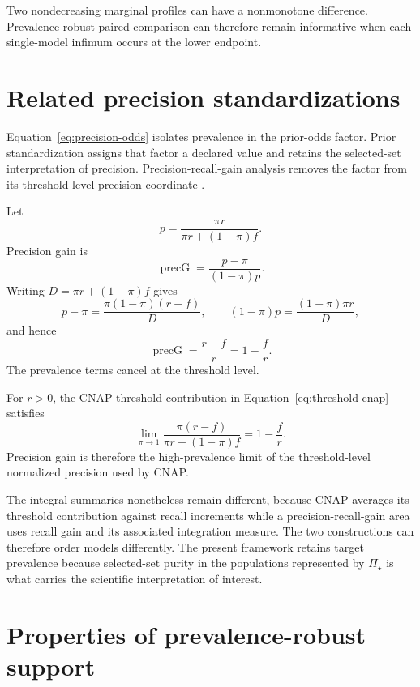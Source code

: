 \documentclass[11pt]{article}
\newcommand{\PSet}{\Pi_\star}
\theoremstyle{remark}
\begin{document}
Two nondecreasing marginal profiles can have a nonmonotone difference. Prevalence-robust paired comparison can therefore remain informative when each single-model infimum occurs at the lower endpoint.

\section{Related precision standardizations}
\label{app:related}

Equation~\eqref{eq:precision-odds} isolates prevalence in the prior-odds factor. Prior standardization assigns that factor a declared value and retains the selected-set interpretation of precision. Precision-recall-gain analysis removes the factor from its threshold-level precision coordinate \cite{flach2015prg}.

Let
\[
p
=
\frac{\pi r}{\pi r+(1-\pi)f}.
\]
Precision gain is
\[
\operatorname{precG}
=
\frac{p-\pi}{(1-\pi)p}.
\]
Writing $D=\pi r+(1-\pi)f$ gives
\[
p-\pi
=
\frac{\pi(1-\pi)(r-f)}{D},
\qquad
(1-\pi)p
=
\frac{(1-\pi)\pi r}{D},
\]
and hence
\begin{equation}
\operatorname{precG}
=
\frac{r-f}{r}
=
1-\frac{f}{r}.
\label{eq:precision-gain}
\end{equation}
The prevalence terms cancel at the threshold level.

For $r>0$, the CNAP threshold contribution in Equation~\eqref{eq:threshold-cnap} satisfies
\begin{equation}
\lim_{\pi\to1}
\frac{\pi(r-f)}
{\pi r+(1-\pi)f}
=
1-\frac{f}{r}.
\label{eq:precision-gain-limit}
\end{equation}
Precision gain is therefore the high-prevalence limit of the threshold-level normalized precision used by CNAP.

The integral summaries nonetheless remain different, because CNAP averages its threshold contribution against recall increments while a precision-recall-gain area uses recall gain and its associated integration measure. The two constructions can therefore order models differently. The present framework retains target prevalence because selected-set purity in the populations represented by $\PSet$ is what carries the scientific interpretation of interest.

\section{Properties of prevalence-robust support}
\label{app:proofs}
\end{document}
